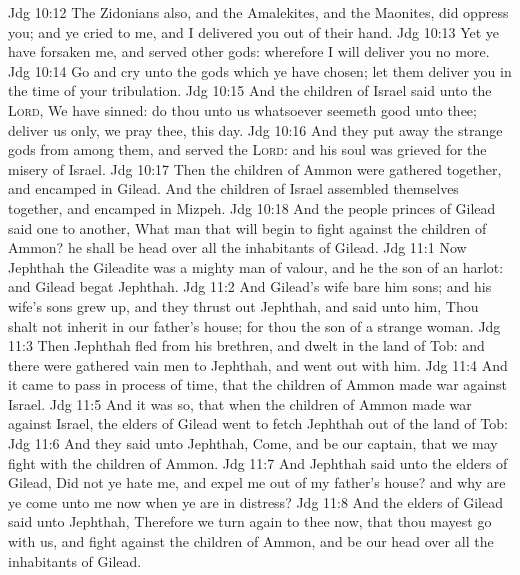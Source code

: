 \vs Jdg 10:12 The Zidonians also, and the Amalekites, and the Maonites, did oppress you; and ye cried to me, and I delivered you out of their hand.
\vs Jdg 10:13 Yet ye have forsaken me, and served other gods: wherefore I will deliver you no more.
\vs Jdg 10:14 Go and cry unto the gods which ye have chosen; let them deliver you in the time of your tribulation.
\vs Jdg 10:15 And the children of Israel said unto the \textsc{Lord}, We have sinned: do thou unto us whatsoever seemeth good unto thee; deliver us only, we pray thee, this day.
\vs Jdg 10:16 And they put away the strange gods from among them, and served the \textsc{Lord}: and his soul was grieved for the misery of Israel.
\vs Jdg 10:17 Then the children of Ammon were gathered together, and encamped in Gilead. And the children of Israel assembled themselves together, and encamped in Mizpeh.
\vs Jdg 10:18 And the people  princes of Gilead said one to another, What man  that will begin to fight against the children of Ammon? he shall be head over all the inhabitants of Gilead.
\vs Jdg 11:1 Now Jephthah the Gileadite was a mighty man of valour, and he  the son of an harlot: and Gilead begat Jephthah.
\vs Jdg 11:2 And Gilead's wife bare him sons; and his wife's sons grew up, and they thrust out Jephthah, and said unto him, Thou shalt not inherit in our father's house; for thou  the son of a strange woman.
\vs Jdg 11:3 Then Jephthah fled from his brethren, and dwelt in the land of Tob: and there were gathered vain men to Jephthah, and went out with him.
\vs Jdg 11:4 And it came to pass in process of time, that the children of Ammon made war against Israel.
\vs Jdg 11:5 And it was so, that when the children of Ammon made war against Israel, the elders of Gilead went to fetch Jephthah out of the land of Tob:
\vs Jdg 11:6 And they said unto Jephthah, Come, and be our captain, that we may fight with the children of Ammon.
\vs Jdg 11:7 And Jephthah said unto the elders of Gilead, Did not ye hate me, and expel me out of my father's house? and why are ye come unto me now when ye are in distress?
\vs Jdg 11:8 And the elders of Gilead said unto Jephthah, Therefore we turn again to thee now, that thou mayest go with us, and fight against the children of Ammon, and be our head over all the inhabitants of Gilead.
